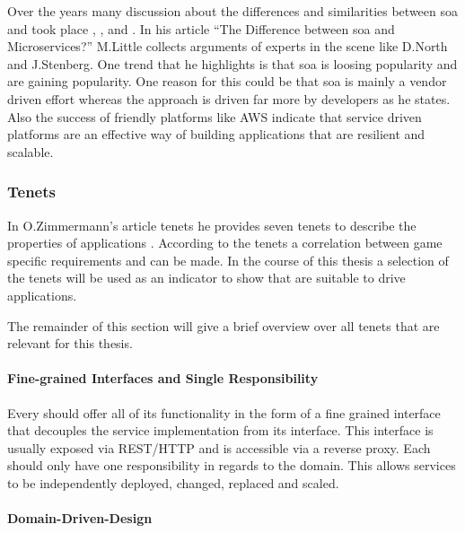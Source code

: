 Over the years many discussion about the differences and similarities between
\gls{soa} and \mss{} took place \cite{little2017soaVSms},
\cite{ogradly2017soaVSms}, and \cite{little2015soaVSms}. In his article ``The
Difference between \gls{soa} and Microservices?'' M.Little collects arguments of
experts in the \ms{} scene like D.North \cite{north2015mss} and
J.Stenberg\cite{stenberg2014mss}. One trend that he highlights is that \gls{soa}
is loosing popularity and \mss{} are gaining popularity. One reason for this
could be that \gls{soa} is mainly a vendor driven effort whereas the \ms{}
approach is driven far more by developers as he states. Also the success of
\ms{} friendly platforms like AWS indicate that service driven platforms are an
effective way of building applications that are resilient and scalable.

\subsubsection{\msuc{} Tenets}

In O.Zimmermann's article \ms{} tenets he provides seven \ms{} tenets to
describe the properties of \ms{} applications
\cite{zimmermann2016microservices}. According to the tenets a correlation
between game specific requirements and \ogs{} can be made. In the course of this
thesis a selection of the \ms{} tenets will be used as an indicator to show
that \mss{} are suitable to drive \og{} applications.

The remainder of this section will give a brief overview over all \ms{} tenets
that are relevant for this thesis.

\paragraph{Fine-grained Interfaces and Single Responsibility}

Every \ms{} should offer all of its functionality in the form of a fine grained
interface that decouples the service implementation from its interface. This
interface is usually exposed via REST/HTTP and is accessible via a reverse
proxy. Each \ms{} should only have one responsibility in regards to the domain.
This allows services to be independently deployed, changed, replaced and scaled.

\paragraph{Domain-Driven-Design}

